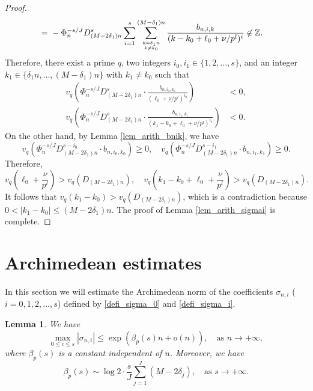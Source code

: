 \documentclass[12pt]{article}
\newtheorem{lemma}[theorem]{Lemma}
\numberwithin{equation}{section}
\begin{document}
\begin{proof}
\begin{align*}
=&~ -\Phi_n^{-s/J} D_{(M-2\delta_1)n}^{s} \sum_{i=1}^{s}\sum_{k=\delta_1n \atop k \neq k_0}^{(M-\delta_1)n} \frac{b_{n,i,k}}{(k-k_0+\ell_0+\nu/p^l)^i} \not\in\mathbb{Z}. 
\end{align*}
Therefore, there exist a prime $q$, two integers $i_0,i_1 \in \{1,2,\ldots,s\}$, and an integer $k_1 \in \{\delta_1 n,\ldots, (M-\delta_1)n\}$ with $k_1 \neq k_0$ such that
\begin{align*}
v_q\left( \Phi_n^{-s/J} D_{(M-2\delta_1)n}^{s} \cdot \frac{b_{n,i_0,k_0}}{(\ell_0+\nu/p^l)^{i_0}}  \right)  &< 0, \\ 
v_q\left( \Phi_n^{-s/J} D_{(M-2\delta_1)n}^{s} \cdot \frac{b_{n,i_1,k_1}}{(k_1-k_0+\ell_0+\nu/p^l)^{i_1}}  \right) &< 0. 
\end{align*}
On the other hand, by Lemma \ref{lem_arith_bnik}, we have
\[ v_q\left( \Phi_n^{-s/J} D_{(M-2\delta_1)n}^{s-i_0} \cdot b_{n,i_0,k_0} \right) \geqslant 0, \quad v_q\left( \Phi_n^{-s/J} D_{(M-2\delta_1)n}^{s-i_1} \cdot b_{n,i_1,k_1}  \right) \geqslant 0.   \]
Therefore, 
\[ v_q\left( \ell_0 + \frac{\nu}{p^l} \right) > v_q(D_{(M-2\delta_1)n}), \quad v_q\left( k_1-k_0+\ell_0+\frac{\nu}{p^l} \right) > v_q(D_{(M-2\delta_1)n}). \]
It follows that $v_q(k_1-k_0) > v_q(D_{(M-2\delta_1)n})$, which is a contradiction because $0<|k_1-k_0| \leqslant (M-2\delta_1)n$. The proof of Lemma \ref{lem_arith_sigmai} is complete.


\end{proof}



\section{Archimedean estimates}\label{Sect_arch_est}

In this section we will estimate the Archimedean norm of the coefficients $\sigma_{n,i}$ ($i=0,1,2,\ldots,s$) defined by \eqref{defi_sigma_0} and \eqref{defi_sigma_i}. 

\begin{lemma}\label{lem_ana_sigma}
We have 
\begin{equation}\label{sigma_estimate}
\max_{0 \leqslant i \leqslant s} |\sigma_{n,i}| \leqslant \exp\left( \beta_p(s)n + o(n) \right), \quad \text{as~} n \to +\infty, 
\end{equation}
where $\beta_p(s)$ is a constant independent of $n$. Moreover, we have
\begin{equation}\label{beta_p}
\beta_p(s) \sim \log2 \cdot \frac{s}{J} \sum_{j=1}^{J} (M - 2\delta_j), \quad\text{as~} s \to +\infty. 
\end{equation}
\end{lemma}
\end{document}
